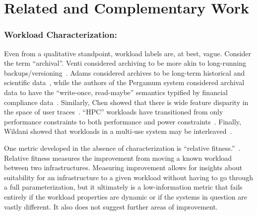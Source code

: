 



\section{Related and Complementary Work}%
\label{sec:related}

\subsubsection*{Workload Characterization: }

Even from a qualitative standpoint, workload labels are, at best, vague.
Consider the term ``archival''. Venti considered archiving to be more akin to
long-running backups/versioning~\cite{venti}. Adams \etal considered
archives to be long-term historical and scientific data~\cite{ian-tos}, while
the authors of the Pergamum system considered archival data to have the ``write-once,
read-maybe'' semantics typified by financial compliance data~\cite{storerfast2008}.
Similarly, Chen \etal showed that there is wide feature disparity in the space
of user traces~\cite{chen-kmeans}.  ``HPC'' workloads have transitioned from
only performance constraints to both performance and power
constraints~\cite{hpcpower}.  Finally, Wildani \etal showed that workloads
in a multi-use system may be interleaved~\cite{hands}. 

One metric developed in the absence of characterization is ``relative
fitness.''~\cite{mesnier07}.  Relative fitness measures the improvement from
moving a known workload between two infrastructures.  Measuring improvement
allows for insights about suitability for an infrastructure to a given workload
without having to go through a full parameterization, but it ultimately is a
low-information metric that fails entirely if the workload properties are
dynamic or if the systems in question are vastly different.  It also does not
suggest further areas of improvement.

